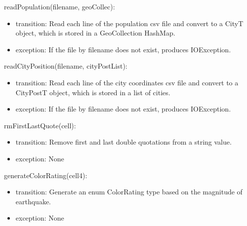 \documentclass[12pt]{article}
\begin{document}
\noindent readPopulation(filename, geoCollec):
\begin{itemize}
\item transition: Read each line of the population csv file and convert to a CityT object, which is stored in a GeoCollection HashMap.
\item exception: If the file by filename does not exist, produces IOException.
\end{itemize}

\noindent readCityPosition(filename, cityPostList):
\begin{itemize}
\item transition: Read each line of the city coordinates csv file and convert to a CityPostT object,
 which is stored in a list of cities.
\item exception: If the file by filename does not exist, produces IOException.
\end{itemize}

\noindent rmFirstLastQuote(cell):
\begin{itemize}
\item transition: Remove first and last double quotations from a string value.
\item exception: None
\end{itemize}

\noindent generateColorRating(cell4):
\begin{itemize}
\item transition: Generate an enum ColorRating type based on the magnitude of earthquake.
\item exception: None
\end{itemize}
\end{document}
